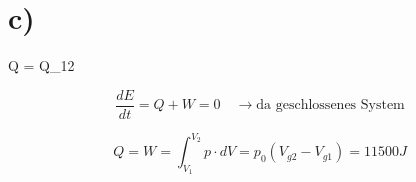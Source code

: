 

\section*{c)}

 Q = Q_{12}

\[
\frac{dE}{dt} = Q + W = 0 \quad \rightarrow \text{da geschlossenes System}
\]

\[
Q = W = \int_{V_1}^{V_2} p \cdot dV = p_0 (V_{g2} - V_{g1}) = 11500 J
\]